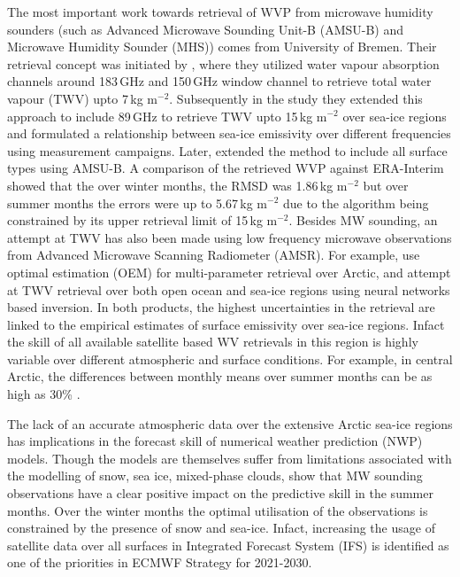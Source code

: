 \documentclass[12pt,oneside,a4paper]{article}
\begin{document}
The most important work towards retrieval of WVP from microwave humidity sounders (such as Advanced Microwave Sounding Unit-B (AMSU-B) and Microwave
Humidity Sounder (MHS)) comes from University of Bremen. Their retrieval
concept was initiated by \citet{miao:2001:atmos}, where they utilized water
vapour absorption channels around 183\,GHz and 150\,GHz window channel to
retrieve total water vapour (TWV) upto 7\,kg m$^{-2}$. Subsequently in the
study \citep{} they extended this approach to include 89\,GHz to retrieve TWV
upto 15\,kg m$^{-2}$ over sea-ice regions and formulated a relationship between
sea-ice emissivity over different frequencies using measurement campaigns.
Later, \cite{scarlat:2018:retri} extended the method to include all surface
types using AMSU-B. A comparison of the retrieved WVP against ERA-Interim
showed that the over winter months, the RMSD was 1.86\,kg m$^{-2}$ but over
summer months the errors were up to 5.67\,kg m$^{-2}$ due to the algorithm being
constrained by its upper retrieval limit of 15\,kg m$^{-2}$. Besides MW sounding,
an attempt at TWV has also been made using low frequency microwave observations
from Advanced Microwave Scanning Radiometer (AMSR). For example,
\citet{scarlat:2017:exper} use optimal estimation (OEM) for multi-parameter
retrieval over Arctic, and \citet{zabolotskikh:2020:anadv} attempt at TWV
retrieval over both open ocean and sea-ice regions using neural networks based
inversion. In both products, the highest uncertainties in the retrieval are
linked to the empirical estimates of surface emissivity over sea-ice regions. Infact the skill of all available satellite based WV retrievals in this region is highly variable over different atmospheric and surface conditions. For example, in central Arctic, the differences between monthly means over summer months can be as high as 30\% \citep{crewell:2021:asyst}.
 
The lack of an accurate atmospheric data over the extensive Arctic sea-ice regions has implications in the forecast skill of numerical weather prediction (NWP) models. Though the  models are themselves suffer from limitations associated with the modelling of snow, sea ice, mixed-phase clouds, \citet{lawrence:2019:usean} show that MW sounding observations have a clear positive impact on the predictive skill in the summer months. Over the winter months the optimal utilisation of the observations is constrained by the presence of snow and sea-ice. Infact,  increasing the usage of satellite data over all surfaces in Integrated Forecast System (IFS) is identified as one of the priorities in ECMWF Strategy for 2021-2030. 
\end{document}
